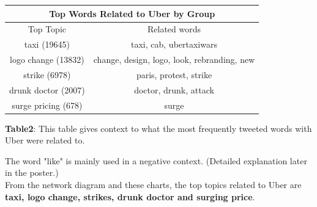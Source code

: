 \documentclass[a222,landscape]{a0poster}
\begin{document}
\begin{multicols}{4}
\begin{center}
\color{DarkSlateGray}

\normalsize

\medskip

\begin{tabular}[2pt]{|c|c|}
\hline
\multicolumn{2}{|c|}{\cellcolor{blue!25}Top Words Related to Uber by Group} \\
\hline
Top Topic  & Related words \\\hline
taxi (19645) & taxi, cab, ubertaxiwars \\
logo change (13832) & change, design, logo, look, rebranding, new \\
strike (6978) & paris, protest, strike \\
drunk doctor (2007) & doctor, drunk, attack \\
surge pricing (678) & surge \\\hline
\end{tabular}

\vspace{0.5 cm}

\small \textbf{Table2}:\color{Green} This table gives context to what the most frequently tweeted words with Uber were related to.

\color{DarkSlateGray}
\end{center}
\normalsize
The word "like" is mainly used in a negative context. (Detailed explanation later in the poster.) \\
\newline
From the network diagram and these charts, the top topics related to Uber are \textbf{taxi, logo change, strikes, drunk doctor and surging price}. 


\end{multicols}
\end{document}
